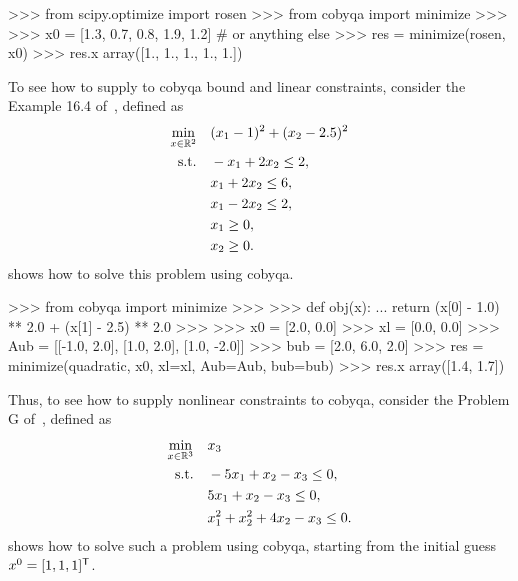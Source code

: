 \begin{lstpython}[%
    caption=Solving the Rosenbrock problem using \gls{cobyqa},
    label=lst:cobyqa-rosenbrock,
]
    >>> from scipy.optimize import rosen
    >>> from cobyqa import minimize
    >>>
    >>> x0 = [1.3, 0.7, 0.8, 1.9, 1.2]  # or anything else
    >>> res = minimize(rosen, x0)
    >>> res.x
    array([1., 1., 1., 1., 1.]) 
\end{lstpython}

To see how to supply to \gls{cobyqa} bound and linear constraints, consider the Example 16.4 of~\cite{Nocedal_Wright_2006}, defined as
\begin{align*}
    \min_{\iter \in \R^2}   & \quad (\iter_1 - 1)^2 + (\iter_2 - 2.5)^2\\
    \text{s.t.}             & \quad -\iter_1 + 2 \iter_2 \le 2,\\
                            & \quad \iter_1 + 2 \iter_2 \le 6,\\
                            & \quad \iter_1 - 2 \iter_2 \le 2,\\
                            & \quad \iter_1 \ge 0,\\
                            & \quad \iter_2 \ge 0.
\end{align*}
 shows how to solve this problem using \gls{cobyqa}.

\begin{lstpython}[%
    caption=An example of \gls{cobyqa} with linear constraints,
    label=lst:cobyqa-bound-linear,
]
    >>> from cobyqa import minimize
    >>>
    >>> def obj(x):
    ...     return (x[0] - 1.0) ** 2.0 + (x[1] - 2.5) ** 2.0
    >>>
    >>> x0 = [2.0, 0.0]
    >>> xl = [0.0, 0.0]
    >>> Aub = [[-1.0, 2.0], [1.0, 2.0], [1.0, -2.0]]
    >>> bub = [2.0, 6.0, 2.0]
    >>> res = minimize(quadratic, x0, xl=xl, Aub=Aub, bub=bub)
    >>> res.x
    array([1.4, 1.7])
\end{lstpython}

Thus, to see how to supply nonlinear constraints to \gls{cobyqa}, consider the Problem G of~\cite{Powell_1994}, defined as
\begin{align*}
    \min_{\iter \in \R^3}   & \quad \iter_3\\
    \text{s.t.}             & \quad -5 \iter_1 + \iter_2 - \iter_3 \le 0,\\
                            & \quad 5 \iter_1 + \iter_2 - \iter_3 \le 0,\\
                            & \quad \iter_1^2 + \iter_2^2 + 4 \iter_2 - \iter_3 \le 0.
\end{align*}
 shows how to solve such a problem using \gls{cobyqa}, starting from the initial guess~$\iter[0] = [1, 1, 1]^{\T}$.

